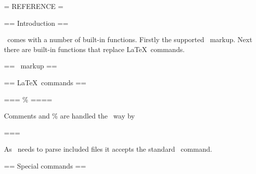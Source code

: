 
= REFERENCE =

== Introduction ==

\wikitexer\ comes with a number of built-in functions. Firstly the
supported \mediawiki\ markup. Next there are built-in functions that
replace \LaTeX\ commands. 

== \mediawiki\ markup ==

== \LaTeX\ commands ==

=== \% ====

Comments and \% are handled the \latex\ way by \wikitexer\

=== 

As \wiktexer\ needs to parse included files it accepts the standard
\ command.

== Special commands ==
